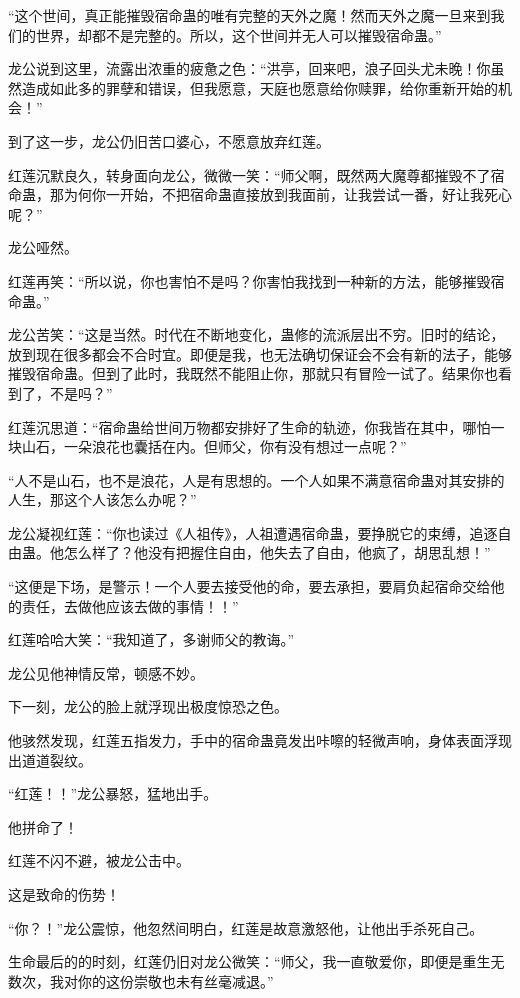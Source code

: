 \begin{this_body}
“这个世间，真正能摧毁宿命蛊的唯有完整的天外之魔！然而天外之魔一旦来到我们的世界，却都不是完整的。所以，这个世间并无人可以摧毁宿命蛊。”

龙公说到这里，流露出浓重的疲惫之色：“洪亭，回来吧，浪子回头尤未晚！你虽然造成如此多的罪孽和错误，但我愿意，天庭也愿意给你赎罪，给你重新开始的机会！”

到了这一步，龙公仍旧苦口婆心，不愿意放弃红莲。

红莲沉默良久，转身面向龙公，微微一笑：“师父啊，既然两大魔尊都摧毁不了宿命蛊，那为何你一开始，不把宿命蛊直接放到我面前，让我尝试一番，好让我死心呢？”

龙公哑然。

红莲再笑：“所以说，你也害怕不是吗？你害怕我找到一种新的方法，能够摧毁宿命蛊。”

龙公苦笑：“这是当然。时代在不断地变化，蛊修的流派层出不穷。旧时的结论，放到现在很多都会不合时宜。即便是我，也无法确切保证会不会有新的法子，能够摧毁宿命蛊。但到了此时，我既然不能阻止你，那就只有冒险一试了。结果你也看到了，不是吗？”

红莲沉思道：“宿命蛊给世间万物都安排好了生命的轨迹，你我皆在其中，哪怕一块山石，一朵浪花也囊括在内。但师父，你有没有想过一点呢？”

“人不是山石，也不是浪花，人是有思想的。一个人如果不满意宿命蛊对其安排的人生，那这个人该怎么办呢？”

龙公凝视红莲：“你也读过《人祖传》，人祖遭遇宿命蛊，要挣脱它的束缚，追逐自由蛊。他怎么样了？他没有把握住自由，他失去了自由，他疯了，胡思乱想！”

“这便是下场，是警示！一个人要去接受他的命，要去承担，要肩负起宿命交给他的责任，去做他应该去做的事情！！”

红莲哈哈大笑：“我知道了，多谢师父的教诲。”

龙公见他神情反常，顿感不妙。

下一刻，龙公的脸上就浮现出极度惊恐之色。

他骇然发现，红莲五指发力，手中的宿命蛊竟发出咔嚓的轻微声响，身体表面浮现出道道裂纹。

“红莲！！”龙公暴怒，猛地出手。

他拼命了！

红莲不闪不避，被龙公击中。

这是致命的伤势！

“你？！”龙公震惊，他忽然间明白，红莲是故意激怒他，让他出手杀死自己。

生命最后的的时刻，红莲仍旧对龙公微笑：“师父，我一直敬爱你，即便是重生无数次，我对你的这份崇敬也未有丝毫减退。”


\end{this_body}
